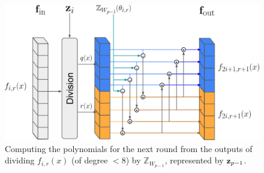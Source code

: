 \begin{figure}[tbh]
	\centering
	\includegraphics[width=0.75\linewidth]{Figures/Division.jpg}
	\caption[Computing the polynomials for the next round of the Cantor FFT algorithm]{Computing the polynomials for the next round from the outputs of dividing \( f_{i,r}(x) \) (of degree \( < 8 \)) by \( \mathbb{Z}_{W_{p-1}} \), represented by \( {\bf{z}}_{p-1} \). %
	}  
	\label{fig:division}
\end{figure}

